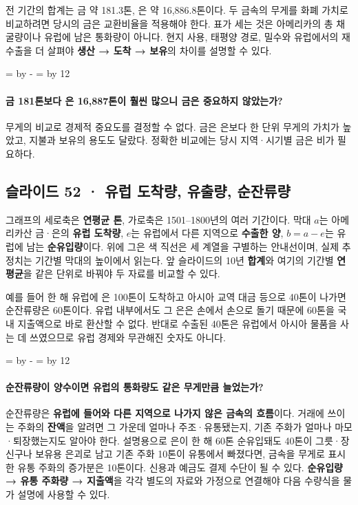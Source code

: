 \documentclass[10pt,a4paper]{article}
\newcommand{\ReserveQuestionSpace}{%
  \par\begingroup
  \dimen0=\pagegoal \advance\dimen0 by -\pagetotal
  \dimen2=\baselineskip \multiply\dimen2 by 12
  \ifdim\dimen0<\dimen2 \newpage\fi
  \endgroup}
\begin{document}
전 기간의 합계는 금 약 181.3톤, 은 약 16,886.8톤이다. 두 금속의 무게를 화폐 가치로 비교하려면 당시의 금은 교환비율을 적용해야 한다. 표가 세는 것은 아메리카의 총 채굴량이나 유럽에 남은 통화량이 아니다. 현지 사용, 태평양 경로, 밀수와 유럽에서의 재수출을 더 살펴야 \textbf{생산 → 도착 → 보유}의 차이를 설명할 수 있다.\par

\ReserveQuestionSpace
\paragraph{금 181톤보다 은 16,887톤이 훨씬 많으니 금은 중요하지 않았는가?}
무게의 비교로 경제적 중요도를 결정할 수 없다. 금은 은보다 한 단위 무게의 가치가 높았고, 지불과 보유의 용도도 달랐다. 정확한 비교에는 당시 지역·시기별 금은 비가 필요하다.\par

\subsection{슬라이드 52 · 유럽 도착량, 유출량, 순잔류량}
그래프의 세로축은 \textbf{연평균 톤}, 가로축은 1501–1800년의 여러 기간이다. 막대 $a$는 아메리카산 금·은의 \textbf{유럽 도착량}, $e$는 유럽에서 다른 지역으로 \textbf{수출한 양}, $b=a-e$는 유럽에 남는 \textbf{순유입량}이다. 위에 그은 색 직선은 세 계열을 구별하는 안내선이며, 실제 추정치는 기간별 막대의 높이에서 읽는다. 앞 슬라이드의 10년 \textbf{합계}와 여기의 기간별 \textbf{연평균}을 같은 단위로 바꿔야 두 자료를 비교할 수 있다.\par

예를 들어 한 해 유럽에 은 100톤이 도착하고 아시아 교역 대금 등으로 40톤이 나가면 순잔류량은 60톤이다. 유럽 내부에서도 그 은은 손에서 손으로 돌기 때문에 60톤을 국내 지출액으로 바로 환산할 수 없다. 반대로 수출된 40톤은 유럽에서 아시아 물품을 사는 데 쓰였으므로 유럽 경제와 무관해진 숫자도 아니다.\par

\ReserveQuestionSpace
\paragraph{순잔류량이 양수이면 유럽의 통화량도 같은 무게만큼 늘었는가?}
순잔류량은 \textbf{유럽에 들어와 다른 지역으로 나가지 않은 금속의 흐름}이다. 거래에 쓰이는 주화의 \textbf{잔액}을 알려면 그 가운데 얼마나 주조·유통됐는지, 기존 주화가 얼마나 마모·퇴장했는지도 알아야 한다. 설명용으로 은이 한 해 60톤 순유입돼도 40톤이 그릇·장신구나 보유용 은괴로 남고 기존 주화 10톤이 유통에서 빠졌다면, 금속을 무게로 표시한 유통 주화의 증가분은 10톤이다. 신용과 예금도 결제 수단이 될 수 있다. \textbf{순유입량 → 유통 주화량 → 지출액}을 각각 별도의 자료와 가정으로 연결해야 다음 수량식을 물가 설명에 사용할 수 있다.\par
\end{document}
